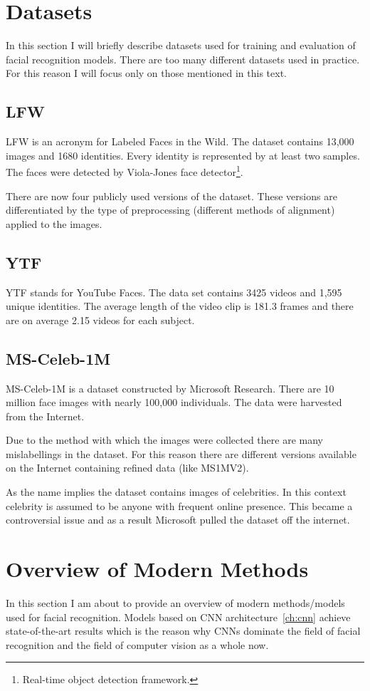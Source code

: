 \section{Datasets}\label{sec:datasets}
In this section I will briefly describe datasets used for training and evaluation of facial recognition models.
There are too many different datasets used in practice.
For this reason I will focus only on those mentioned in this text.

\subsection{LFW}\label{subsec:lfw}
LFW is an acronym for Labeled Faces in the Wild.
The dataset contains 13,000 images and 1680 identities.
Every identity is represented by at least two samples.
The faces were detected by Viola-Jones face detector\footnote{Real-time object detection framework.}.

There are now four publicly used versions of the dataset.
These versions are differentiated by the type of preprocessing (different methods of alignment) applied to the images.

\subsection{YTF}\label{subsec:ytf}
YTF stands for YouTube Faces.
The data set contains 3425 videos and 1,595 unique identities.
The average length of the video clip is 181.3 frames and there are on average 2.15 videos for each subject.

\subsection{MS-Celeb-1M}\label{subsec:ms1m}
MS-Celeb-1M is a dataset constructed by Microsoft Research.
There are 10 million face images with nearly 100,000 individuals.
The data were harvested from the Internet.

Due to the method with which the images were collected there are many mislabellings in the dataset.
For this reason there are different versions available on the Internet containing refined data (like MS1MV2).

As the name implies the dataset contains images of celebrities.
In this context celebrity is assumed to be anyone with frequent online presence.
This became a controversial issue and as a result Microsoft pulled the dataset off the internet.

\section{Overview of Modern Methods}\label{sec:mod-methods}
In this section I am about to provide an overview of modern methods/models used for facial recognition.
Models based on CNN architecture~\ref{ch:cnn} achieve state-of-the-art results which is the reason why CNNs dominate the
field of facial recognition and the field of computer vision as a whole now.

